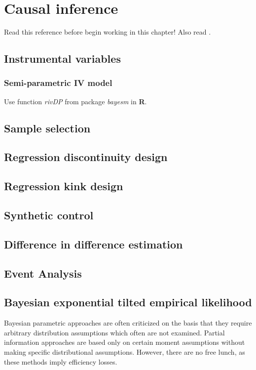 \chapter{Causal inference}\label{chap12}

Read this reference \cite{iacovone2023bayesian} before begin working in this chapter! Also read \cite{imbens1997bayesian}.
\section{Instrumental variables}\label{sec12_1}
\subsection{Semi-parametric IV model}\label{sec12_11}
Use function \textit{rivDP} from package \textit{bayesm} in \textbf{R}.

\section{Sample selection}\label{sec12_2}

\section{Regression discontinuity design}\label{sec12_3}

\section{Regression kink design}\label{sec12_4}

\section{Synthetic control}\label{sec12_5}

\section{Difference in difference estimation}\label{sec12_6}

\section{Event Analysis}\label{sec12_7}

\section{Bayesian exponential tilted empirical likelihood}\label{sec12_8}
Bayesian parametric approaches are often criticized on the basis that they require arbitrary distribution assumptions which often are not examined. Partial information approaches are based only on certain moment assumptions without making specific distributional assumptions. However, there are no free lunch, as these methods imply efficiency losses.


